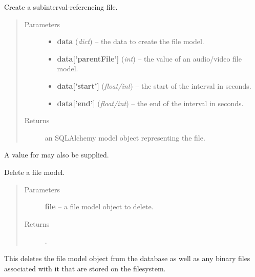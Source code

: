 \documentclass[letterpaper,10pt,english]{sphinxmanual}
\begin{document}
\begin{fulllineitems}
\label{api:onlinelinguisticdatabase.controllers.files.createSubintervalReferencingFile}
Create a subinterval-referencing file.
\begin{quote}\begin{description}
\item[{Parameters}] \leavevmode\begin{itemize}
\item {} 
\textbf{data} (\emph{dict}) -- the data to create the file model.

\item {} 
\textbf{data{[}'parentFile'{]}} (\emph{int}) -- the  value of an audio/video file model.

\item {} 
\textbf{data{[}'start'{]}} (\emph{float/int}) -- the start of the interval in seconds.

\item {} 
\textbf{data{[}'end'{]}} (\emph{float/int}) -- the end of the interval in seconds.

\end{itemize}

\item[{Returns}] \leavevmode
an SQLAlchemy model object representing the file.

\end{description}\end{quote}

A value for  may also be supplied.

\end{fulllineitems}


\begin{fulllineitems}
\label{api:onlinelinguisticdatabase.controllers.files.deleteFile}
Delete a file model.
\begin{quote}\begin{description}
\item[{Parameters}] \leavevmode
\textbf{file} -- a file model object to delete.

\item[{Returns}] \leavevmode
{}.

\end{description}\end{quote}

This deletes the file model object from the database as well as any binary
files associated with it that are stored on the filesystem.

\end{fulllineitems}
\end{document}
